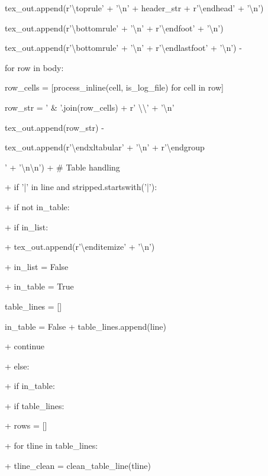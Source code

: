 \documentclass[11pt,a4paper]{article}
\begin{document}
\begin{itemize}
{\item                tex\_out.append(r'\textbackslash{}toprule' + '\textbackslash{}n' + header\_str + r'\textbackslash{}endhead' + '\textbackslash{}n')
\item                tex\_out.append(r'\textbackslash{}bottomrule' + '\textbackslash{}n' + r'\textbackslash{}endfoot' + '\textbackslash{}n')
\item                tex\_out.append(r'\textbackslash{}bottomrule' + '\textbackslash{}n' + r'\textbackslash{}endlastfoot' + '\textbackslash{}n')
-

\item                for row in body:
\item                    row\_cells = [process\_inline(cell, is\_log\_file) for cell in row]
\item                    row\_str = ' \& '.join(row\_cells) + r' \textbackslash{}\textbackslash{}' + '\textbackslash{}n'
\item                    tex\_out.append(row\_str)
-

\item                tex\_out.append(r'\textbackslash{}end{xltabular}' + '\textbackslash{}n' + r'\textbackslash{}endgroup}' + '\textbackslash{}n\textbackslash{}n')
+        \# Table handling

+        if '|' in line and stripped.startswith('|'):

+            if not in\_table:

+                if in\_list:

+                    tex\_out.append(r'\textbackslash{}end{itemize}' + '\textbackslash{}n')

+                    in\_list = False

+                in\_table = True

table\_lines = []

\item                in\_table = False
+            table\_lines.append(line)

+            continue

+        else:

+            if in\_table:

+                if table\_lines:

+                    rows = []

+                    for tline in table\_lines:

+                        tline\_clean = clean\_table\_line(tline)


\end{itemize}
\end{document}
